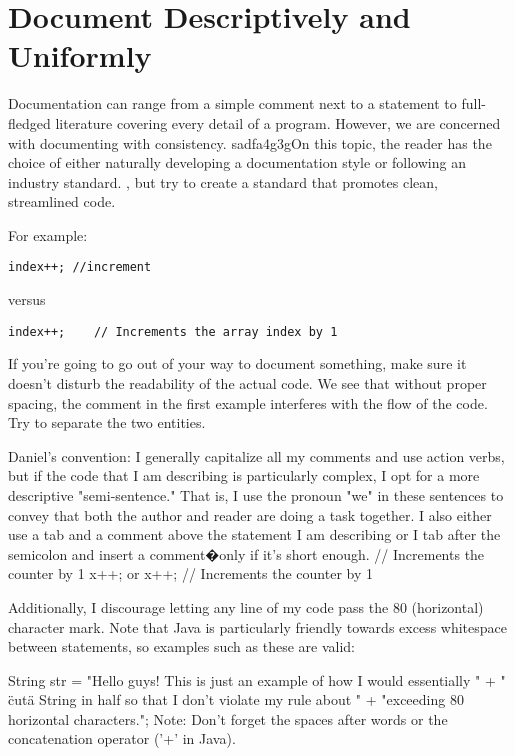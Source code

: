 \documentclass[11pt,oneside]{article}
\newenvironment{articleSection}[1]
{\begin{list}{}
         {\setlength{\leftmargin}{1cm}}
         \item[]
}
{\end{list}}
\begin{document}
\section{Document Descriptively and Uniformly}
\begin{articleSection}{0.5cm}
    Documentation can range from a simple comment next to a statement to full-fledged literature covering every detail of a program. However, we are concerned with documenting with consistency. sadfa4g3gOn this topic, the reader has the choice of either naturally developing a documentation style or following an industry standard. 
    , but try to create a standard that promotes clean, streamlined code.
    
For example:

\begin{lstlisting}
index++; //increment
\end{lstlisting}

versus\\
\begin{lstlisting}
index++;	// Increments the array index by 1
\end{lstlisting}
If you're going to go out of your way to document something, make sure it doesn't disturb the readability of the actual code. We see that without proper spacing, the comment in the first example interferes with the flow of the code. Try to separate the two entities.

Daniel's convention: I generally capitalize all my comments and use action verbs, but if the code that I am describing is particularly complex, I opt for a more descriptive "semi-sentence." That is, I use the pronoun "we" in these sentences to convey that both the author and reader are doing a task together.
I also either use a tab and a comment above the statement I am describing or I tab after the semicolon and insert a comment�only if it's short enough.
	// Increments the counter by 1
x++;
or
x++;	// Increments the counter by 1

Additionally, I discourage letting any line of my code pass the 80 (horizontal) character mark. Note that Java is particularly friendly towards excess whitespace between statements, so examples such as these are valid:

String str = "Hello guys! This is just an example of how I would essentially "
		+ " \"cut\" a String in half so that I don't violate my rule about "
		+ "exceeding 80 horizontal characters.";
Note: Don't forget the spaces after words or the concatenation operator ('+' in Java).
\end{articleSection}
 
\end{document}
